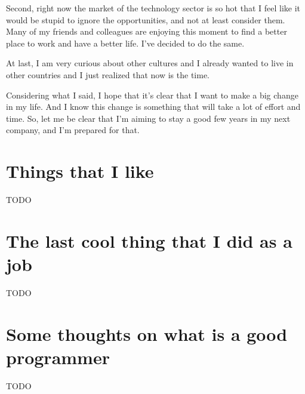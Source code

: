 \documentclass[11pt,a4paper,sans]{moderncv}
\begin{document}
\medskip

Second, right now the market of the technology sector is so hot that I feel like it would be stupid to ignore the opportunities, and not at least consider them.
Many of my friends and colleagues are enjoying this moment to find a better place to work and have a better life.
I've decided to do the same.

\medskip

At last, I am very curious about other cultures and I already wanted to live in other countries and I just realized that now is the time.

\medskip

Considering what I said, I hope that it's clear that I want to make a big change in my life.
And I know this change is something that will take a lot of effort and time.
So, let me be clear that I'm aiming to stay a good few years in my next company, and I'm prepared for that.

\section{Things that I like}
TODO

\section{The last cool thing that I did as a job}
TODO

\section{Some thoughts on what is a good programmer}
TODO
\end{document}
